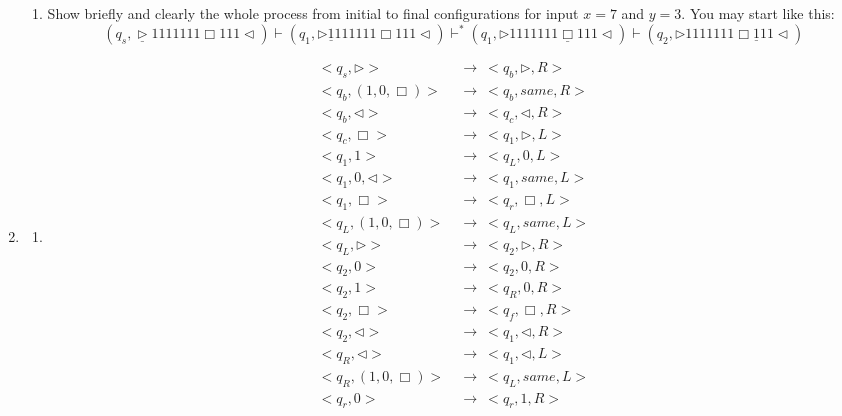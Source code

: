 \documentclass[12pt,a4paper]{article}
\makeatletter
\newtheorem*{solution}{Solution}
\theoremstyle{definition}
\renewenvironment{solution}[1][Solution] {\par\pushQED{\qed}\normalfont\topsep6\p@\@plus6\p@\relax\trivlist\item[\hskip\labelsep\bfseries#1\@addpunct{.}]\ignorespaces}{\popQED\endtrivlist\@endpefalse} \makeatother
\makeatother
\begin{document}
\begin{enumerate}
\begin{enumerate}
	\item
	Show briefly and clearly the whole process from initial to final configurations for input $x = 7$ and $y = 3$. You may start like this:
	$$(q_s,\underline{\triangleright}  1  1  1  1  1  1  1  \Box 1  1  1   \triangleleft)
	\vdash (q_1,\triangleright  \underline{1}  1  1  1  1  1  1  \Box 1  1  1   \triangleleft)
	\vdash^* (q_1,\triangleright  1  1  1  1  1  1  1  \underline{\Box} 1  1  1   \triangleleft)
	\vdash (q_2,\triangleright  1  1  1  1  1  1  1  \Box \underline{1}  1  1   \triangleleft)$$

	
\end{enumerate}
\begin{solution}
    \begin{enumerate}
        \item 
        \begin{equation}
            \begin{aligned}
            <q_s,\triangleright> ~&\rightarrow~ <q_b,\triangleright,R>\\
            <q_b,(1,0,\Box)> ~&\rightarrow~ <q_b,same,R>\\
            <q_b,\triangleleft> ~&\rightarrow~ <q_c,\triangleleft,R>\\
            <q_c,\Box> ~&\rightarrow~ <q_1,\triangleright,L>\\
            <q_1,1> ~&\rightarrow~ <q_L,0,L>\\
            <q_1,0,\triangleleft> ~&\rightarrow~ <q_1,same,L>\\
            <q_1,\Box> ~&\rightarrow~ <q_r,\Box,L>\\
            <q_L,(1,0,\Box)> ~&\rightarrow~ <q_L,same,L>\\
            <q_L,\triangleright> ~&\rightarrow~ <q_2,\triangleright,R>\\
            <q_2,0> ~&\rightarrow~ <q_2,0,R>\\
            <q_2,1> ~&\rightarrow~ <q_R,0,R>\\
            <q_2,\Box> ~&\rightarrow~ <q_f,\Box,R>\\
            <q_2,\triangleleft> ~&\rightarrow~ <q_1,\triangleleft,R>\\
            <q_R,\triangleleft> ~&\rightarrow~ <q_1,\triangleleft,L>\\
            <q_R,(1,0,\Box)> ~&\rightarrow~ <q_L,same,L>\\
            <q_r,0> ~&\rightarrow~ <q_r,1,R>\\

\end{aligned}
\end{equation}
\end{enumerate}
\end{solution}
\end{enumerate}
\end{document}
